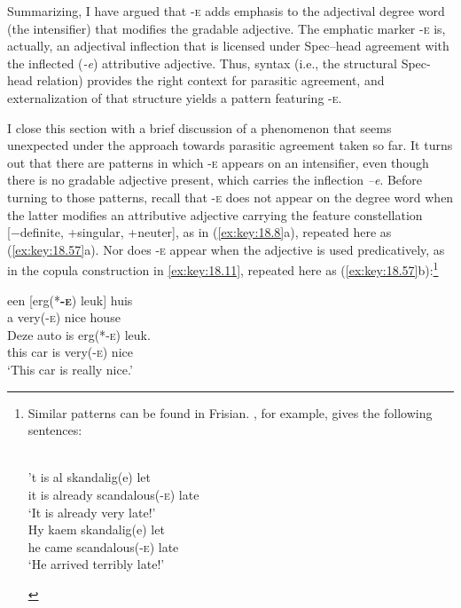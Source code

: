 \documentclass[output=paper]{langsci/langscibook}
\begin{document}
Summarizing, I have argued that \textsc{-e} adds emphasis to the adjectival
degree word (the intensifier) that modifies the      gradable adjective. The
emphatic marker \textsc{-e} is, actually, an adjectival inflection that is
licensed under Spec--head agreement with the inflected (\emph{-e}) attributive
adjective. Thus, syntax (i.e., the structural Spec-head relation) provides the
right context for parasitic agreement, and externalization of that structure
yields a pattern featuring \textsc{-e}.

I close this section with a brief discussion of a phenomenon that seems
unexpected under the approach towards parasitic agreement taken so far. It
turns out that there are patterns in which \textsc{-e} appears on an
intensifier, even though there is no gradable adjective present, which carries
the inflection \emph{–e}. Before turning to those patterns, recall that
\textsc{-e} does not appear on the degree word when the latter modifies an
attributive adjective carrying the feature constellation [−definite, +singular,
+neuter], as in (\ref{ex:key:18.8}a), repeated here as (\ref{ex:key:18.57}a). Nor does
\textsc{-e} appear when the adjective is used predicatively, as in the
copula
construction in \eqref{ex:key:18.11}, repeated here as
(\ref{ex:key:18.57}b):\footnote{Similar patterns can be found in Frisian.
    \citet{Verdenius1939}, for example, gives the following sentences:

\begin{exe}
    \\
	\gll 't is al skandalig(e) let\\
		it is already scandalous(\textsc{-e}) late\\
	\glt \enquote*{It is already very late!}
    \\
	\gll Hy kaem skandalig(e) let\\
		he came scandalous(\textsc{-e}) late\\
	\glt \enquote*{He arrived terribly late!}
\end{exe}\label{fn:18.16}}

\ea%
    \label{ex:key:18.57}
	\ea
	\gll  een    [erg(*\textbf{\textsc{-e}})    leuk]  huis\\
		a          very(\textsc{-e})    nice    house\\
	\ex
	\gll Deze  auto    is    erg(*\textsc{-e})  leuk.\\
		this    car      is    very(\textsc{-e})    nice\\
	\glt \enquote*{This car is really nice.}
	\z
\z\newpage
\end{document}
